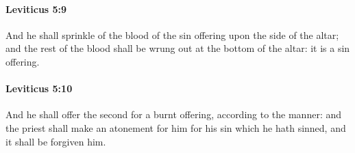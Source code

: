 		\paragraph{Leviticus 5:9} %
			\label{LEVITICUS-5-9}

			And he shall sprinkle of the blood of the sin offering upon the side of the altar; and the rest of the blood shall be wrung out at the bottom of the altar: it is a sin offering.


		\paragraph{Leviticus 5:10} %
			\label{LEVITICUS-5-10}

			And he shall offer the second for a burnt offering, according to the manner: and the priest shall make an atonement for him for his sin which he hath sinned, and it shall be forgiven him.

